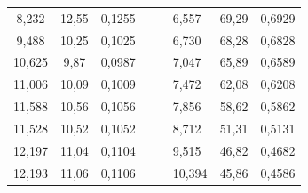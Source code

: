 \begin{enumerate}
\begin{table}[h!]
\begin{tabular}{ccccc|lll|}
				\multicolumn{1}{|c|}{8,232}                     & \multicolumn{1}{c|}{12,55}                    & \multicolumn{1}{c|}{0,1255}    &  &  & \multicolumn{1}{l|}{6,557}                     & \multicolumn{1}{l|}{69,29}                    & 0,6929                         \\ \cline{1-3} \cline{6-8} 
				\multicolumn{1}{|c|}{9,488}                     & \multicolumn{1}{c|}{10,25}                    & \multicolumn{1}{c|}{0,1025}    &  &  & \multicolumn{1}{l|}{6,730}                      & \multicolumn{1}{l|}{68,28}                    & 0,6828                         \\ \cline{1-3} \cline{6-8} 
				\multicolumn{1}{|c|}{10,625}                    & \multicolumn{1}{c|}{9,87}                     & \multicolumn{1}{c|}{0,0987}    &  &  & \multicolumn{1}{l|}{7,047}                     & \multicolumn{1}{l|}{65,89}                    & 0,6589                         \\ \cline{1-3} \cline{6-8} 
				\multicolumn{1}{|c|}{11,006}                    & \multicolumn{1}{c|}{10,09}                    & \multicolumn{1}{c|}{0,1009}    &  &  & \multicolumn{1}{l|}{7,472}                     & \multicolumn{1}{l|}{62,08}                    & 0,6208                         \\ \cline{1-3} \cline{6-8} 
				\multicolumn{1}{|c|}{11,588}                    & \multicolumn{1}{c|}{10,56}                    & \multicolumn{1}{c|}{0,1056}    &  &  & \multicolumn{1}{l|}{7,856}                     & \multicolumn{1}{l|}{58,62}                    & 0,5862                         \\ \cline{1-3} \cline{6-8} 
				\multicolumn{1}{|c|}{11,528}                    & \multicolumn{1}{c|}{10,52}                    & \multicolumn{1}{c|}{0,1052}    &  &  & \multicolumn{1}{l|}{8,712}                     & \multicolumn{1}{l|}{51,31}                    & 0,5131                         \\ \cline{1-3} \cline{6-8} 
				\multicolumn{1}{|c|}{12,197}                    & \multicolumn{1}{c|}{11,04}                    & \multicolumn{1}{c|}{0,1104}    &  &  & \multicolumn{1}{l|}{9,515}                     & \multicolumn{1}{l|}{46,82}                    & 0,4682                         \\ \cline{1-3} \cline{6-8} 
				\multicolumn{1}{|c|}{12,193}                    & \multicolumn{1}{c|}{11,06}                    & \multicolumn{1}{c|}{0,1106}    &  &  & \multicolumn{1}{l|}{10,394}                    & \multicolumn{1}{l|}{45,86}                    & 0,4586                         \\ \cline{1-3} \cline{6-8} 

\end{tabular}
\end{table}
\end{enumerate}

